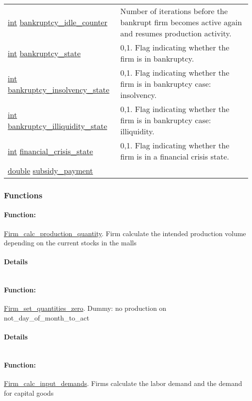 \documentclass[a4paper,11pt]{article}
\begin{document}
\begin{center}
\begin{longtable}[H!]{ll}
\url{int} \url{bankruptcy_idle_counter} & \parbox{10cm}{Number of iterations before the bankrupt firm becomes active again and resumes production activity.} \\
\url{int} \url{bankruptcy_state} & \parbox{10cm}{0,1. Flag indicating whether the firm is in bankruptcy.} \\
\url{int} \url{bankruptcy_insolvency_state} & \parbox{10cm}{0,1. Flag indicating whether the firm is in bankruptcy case: insolvency.} \\
\url{int} \url{bankruptcy_illiquidity_state} & \parbox{10cm}{0,1. Flag indicating whether the firm is in bankruptcy case: illiquidity.} \\
\url{int} \url{financial_crisis_state} & \parbox{10cm}{0,1. Flag indicating whether the firm is in a financial crisis state.} \\
\url{double} \url{subsidy_payment} & \parbox{10cm}{} \\
\end{longtable}
\end{center}
\subsubsection{Functions}
\paragraph{Function:}\url{Firm_calc_production_quantity}.
Firm calculate the intended production volume depending on the current stocks in the malls
\paragraph{Details}
\begin{verbatim}
\end{verbatim}
\paragraph{Function:}\url{Firm_set_quantities_zero}.
Dummy: no production on not\_day\_of\_month\_to\_act
\paragraph{Details}
\begin{verbatim}
\end{verbatim}
\paragraph{Function:}\url{Firm_calc_input_demands}.
Firms calculate the labor demand and the demand for capital goods
\end{document}
